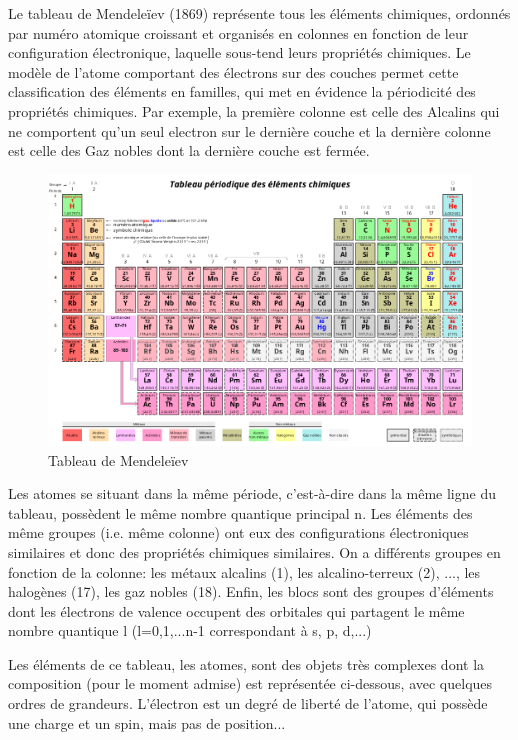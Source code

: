 Le tableau de Mendeleïev (1869) représente tous les éléments chimiques, ordonnés par numéro atomique croissant et organisés en colonnes en fonction de leur configuration électronique, laquelle sous-tend leurs propriétés chimiques.  Le modèle de l'atome comportant des électrons sur des couches permet cette classification des éléments en familles, qui met en évidence la périodicité des propriétés chimiques. Par exemple, la première colonne est celle des Alcalins qui ne comportent qu'un seul electron sur le dernière couche et la dernière colonne est celle des Gaz nobles dont la dernière couche est fermée.

\begin{figure}[ht]
    \centering
    \includegraphics[scale=0.40]{Images1/mend.png}
    \caption{Tableau de Mendeleïev}
\end{figure}

Les atomes se situant dans la même période, c'est-à-dire dans la même ligne du tableau, possèdent le même nombre quantique principal n. Les éléments des même groupes (i.e. même colonne) ont eux des configurations électroniques similaires et donc des propriétés chimiques similaires. On a différents groupes en fonction de la colonne: les métaux alcalins (1), les alcalino-terreux (2), ..., les halogènes (17), les gaz nobles (18). Enfin, les blocs sont des groupes d'éléments dont les électrons de valence occupent des orbitales qui partagent le même nombre quantique l (l=0,1,...n-1 correspondant à s, p, d,...)


Les éléments de ce tableau, les atomes, sont des objets très complexes dont la composition (pour le moment admise) est représentée ci-dessous, avec quelques ordres de grandeurs. L'électron est un degré de liberté de l'atome, qui possède une charge et un spin, mais pas de position...

